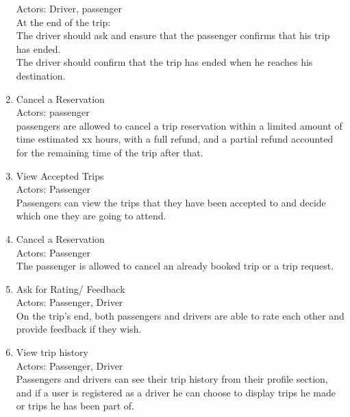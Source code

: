 \documentclass[a4paper, 12pt]{report} %
\begin{document}
\begin{enumerate}
                    Actors: Driver, passenger\\
                    At the end of the trip: \\
                        The driver should ask and ensure that the passenger confirms that his trip has ended. \\
                        The driver should confirm that the trip has ended when he reaches his destination.
                \item Cancel a Reservation\\
                    Actors: passenger\\
                    passengers are allowed to cancel a trip reservation within a limited amount of time estimated xx hours, with a full refund, and a partial refund accounted for the remaining time of the trip after that.
                \item View Accepted Trips\\
                    Actors: Passenger\\
                    Passengers can view the trips that they have been accepted to and decide which one they are going to attend.
                \item Cancel a Reservation\\
                    Actors: Passenger \\
                    The passenger is allowed to cancel an already booked trip or a trip request.
                \item Ask for Rating/ Feedback\\
                    Actors: Passenger, Driver\\
                    On the trip's end, both passengers and drivers are able to rate each other and provide feedback if they wish.
                \item View trip history \\
                    Actors: Passenger, Driver \\
                    Passengers and drivers can see their trip history from their profile section, and if a user is registered as a driver he can choose to display trips he made or trips he has been part of.
            \end{enumerate}
        
\end{document}
